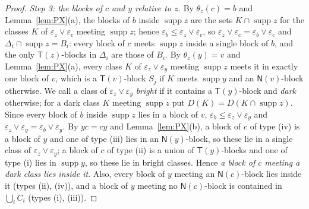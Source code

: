 \documentclass[11pt]{amsart}
\theoremstyle{definition}
\newcommand{\supp}{\operatorname{supp}}
\newcommand{\T}{\mathsf{T}}
\newcommand{\N}{\mathsf{N}}
\begin{document}
\begin{proof}
\smallskip\emph{Step 3: the blocks of $c$ and $y$ relative to $z$.} By $\theta_z(c)=b$ and Lemma~\ref{lem:PX}(a), the blocks of $b$ inside $\supp z$ are the sets $K\cap\supp z$ for the classes $K$ of $\varepsilon_z\vee\varepsilon_c$ meeting $\supp z$; hence $\varepsilon_b\le\varepsilon_z\vee\varepsilon_c$, so $\varepsilon_z\vee\varepsilon_c=\varepsilon_b\vee\varepsilon_c$ and $\Delta_i\cap\supp z=B_i$: every block of $c$ meets $\supp z$ inside a single block of $b$, and the only $\T(z)$-blocks in $\Delta_i$ are those of $B_i$. By $\theta_z(y)=v$ and Lemma~\ref{lem:PX}(a), every class $K$ of $\varepsilon_z\vee\varepsilon_y$ meeting $\supp z$ meets it in exactly one block of $v$, which is a $\T(v)$-block $S_j$ if $K$ meets $\supp y$ and an $\N(v)$-block otherwise. We call a class of $\varepsilon_z\vee\varepsilon_y$ \emph{bright} if it contains a $\T(y)$-block and \emph{dark} otherwise; for a dark class $K$ meeting $\supp z$ put $D(K)=D(K\cap\supp z)$. Since every block of $b$ inside $\supp z$ lies in a block of $v$, $\varepsilon_b\le\varepsilon_z\vee\varepsilon_y$ and $\varepsilon_z\vee\varepsilon_y=\varepsilon_b\vee\varepsilon_y$. By $yc=cy$ and Lemma~\ref{lem:PX}(b), a block of $c$ of type (iv) is a block of $y$ and one of type (iii) lies in an $\N(y)$-block, so these lie in a single class of $\varepsilon_z\vee\varepsilon_y$; a block of $c$ of type (ii) is a union of $\T(y)$-blocks and one of type (i) lies in $\supp y$, so these lie in bright classes. Hence \emph{a block of $c$ meeting a dark class lies inside it}. Also, every block of $y$ meeting an $\N(c)$-block lies inside it (types (ii), (iv)), and a block of $y$ meeting no $\N(c)$-block is contained in $\bigcup_iC_i$ (types (i), (iii)).


\end{proof}
\end{document}
